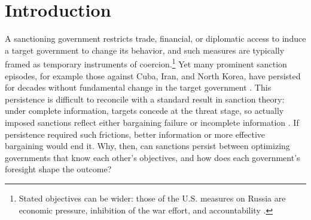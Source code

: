 \section{Introduction}
\label{sec:intro}

A sanctioning government restricts trade, financial, or diplomatic access to induce a
target government to change its behavior, and such measures are typically framed as
temporary instruments of coercion.\footnote{Stated objectives can be wider: those of the U.S. measures on
Russia are economic pressure, inhibition of the war effort, and accountability
\citep[p.~14]{GAO2025RussiaSanctions}.} Yet many prominent sanction episodes, for
example those against Cuba, Iran, and North Korea, have persisted for decades without
fundamental change in the target government
\citep[p.~162]{HalcoussisKaempferLowenberg2021}. This persistence is difficult to
reconcile with a standard result in sanction theory: under complete information,
targets concede at the threat stage, so actually imposed sanctions reflect either
bargaining failure or incomplete information \citep{Drezner2003}. If persistence
required such frictions, better information or more effective bargaining would end it.
Why, then, can sanctions persist between optimizing governments that know each other's
objectives, and how does each government's foresight shape the outcome?

